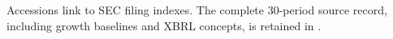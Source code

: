 \label{tab:sources}
{\footnotesize Accessions link to SEC filing indexes. The complete 30-period source record, including growth baselines and XBRL concepts, is retained in .\par}
{\footnotesize\setlength{\tabcolsep}{5pt}\par}
